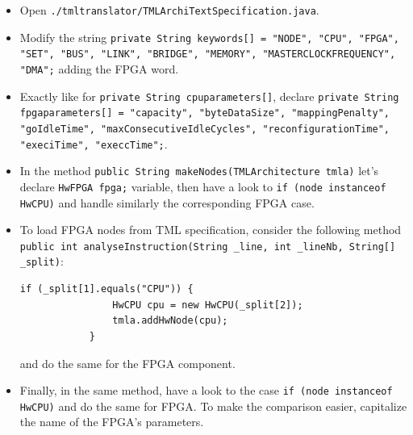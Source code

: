 \documentclass[12pt]{article}
\begin{document}
\begin{itemize}
\item Open \texttt{./tmltranslator/TMLArchiTextSpecification.java}.

\item Modify the string \texttt{private String keywords[] = {"NODE", "CPU", "FPGA", "SET", "BUS", "LINK", "BRIDGE", "MEMORY", "MASTERCLOCKFREQUENCY", "DMA"};} adding the FPGA word.

\item Exactly like for \texttt{private String cpuparameters[]}, declare \texttt{private String fpgaparameters[] = {"capacity", "byteDataSize", "mappingPenalty", "goIdleTime", "maxConsecutiveIdleCycles", "reconfigurationTime", "execiTime", "execcTime"};}. 

\item In the method \texttt{public String makeNodes(TMLArchitecture tmla)} let's declare \texttt{HwFPGA fpga;} variable, then have a look to \texttt{if (node instanceof HwCPU)} and handle similarly the corresponding FPGA case.

\item To load FPGA nodes from TML specification, consider the following method \texttt{public int analyseInstruction(String \_line, int \_lineNb, String[] \_split)}:
 \begin{lstlisting}
if (_split[1].equals("CPU")) {
                HwCPU cpu = new HwCPU(_split[2]);
                tmla.addHwNode(cpu);
            }
\end{lstlisting}
and do the same for the FPGA component.

\item Finally, in the same method, have a look to the case \texttt{if (node instanceof HwCPU)} and do the same for FPGA. To make the comparison easier, capitalize the name of the FPGA's parameters. 
\end{itemize}   
\end{document}
